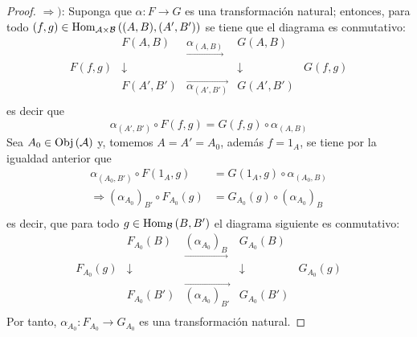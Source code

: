 \documentclass[12pt]{report}
\newcounter{it}
\theoremstyle{largebreak}
\newcommand\cf[3]{\ensuremath{#1:#2\rightarrow#3}}
\newcommand{\Obj}[1]{\ensuremath{\textup{Obj}\left(#1\right)}}
\newcommand{\Hom}[3]{\ensuremath{\textup{Hom}_{#1}\left(#2,#3\right)}}
\begin{document}
    \begin{proof}
        $\Rightarrow)$: Suponga que $\cf{\alpha}{F}{G}$ es una transformación natural; entonces, para todo $(f,g)\in\Hom{\mathcal{A}\times\mathcal{B}}{(A,B)}{(A',B')}$ se tiene que el diagrama es conmutativo:
        \begin{equation}
            \begin{array}{rcccl}
                &F(A,B) & \underset{\longrightarrow}{\alpha_{(A,B)}} & G(A,B) &\\
                F(f,g) & \downarrow & & \downarrow & G(f,g) \\
                &F(A',B') & \overset{\longrightarrow}{\alpha_{ (A',B')}} & G(A',B') &\\
            \end{array}
        \end{equation}
        es decir que
        \begin{equation*}
            \alpha_{(A',B')}\circ F(f,g)=G(f,g)\circ\alpha_{(A,B)}
        \end{equation*}
        Sea $A_0\in\Obj{\mathcal{A}}$ y, tomemos $A=A'=A_0$, además $f=1_A$, se tiene por la igualdad anterior que
        \begin{equation*}
            \begin{split}
                \alpha_{(A_0,B')}\circ F(1_A,g)&=G(1_A,g)\circ\alpha_{(A_0,B)}\\
                \Rightarrow (\alpha_{A_0})_{B'}\circ F_{A_0}(g)&=G_{A_0}(g)\circ (\alpha_{A_0})_B\\
            \end{split}
        \end{equation*}
        es decir, que para todo $g\in\Hom{\mathcal{B}}{B}{B'}$ el diagrama siguiente es conmutativo:
        \begin{equation*}
            \begin{array}{rcccl}
                &F_{A_0}(B) & \underset{\longrightarrow}{(\alpha_{A_0})_{B}} & G_{A_0}(B) &\\
                F_{A_0}(g) & \downarrow & & \downarrow & G_{A_0}(g) \\
                &F_{A_0}(B') & \overset{\longrightarrow}{(\alpha_{A_0})_{B'}} & G_{A_0}(B') &\\
            \end{array}
        \end{equation*}
        Por tanto, $\cf{\alpha_{A_0}}{F_{A_0}}{G_{A_0}}$ es una transformación natural.


\end{proof}
\end{document}
